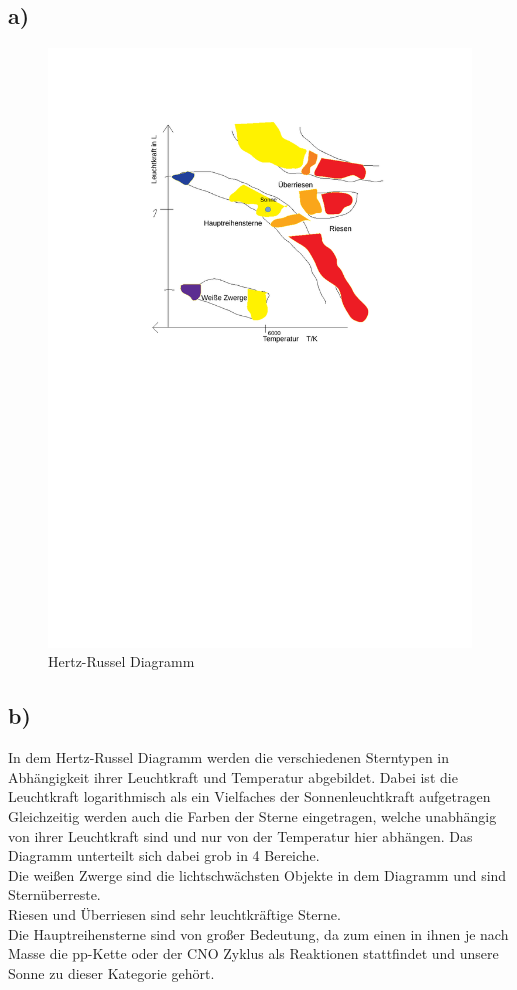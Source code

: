 \subsection{a)}
\begin{figure}[H]
    \centering
    \caption{Hertz-Russel Diagramm}
    \includegraphics[width=\linewidth]{images/hertz_russel.pdf}
\end{figure}

\subsection{b)}
In dem Hertz-Russel Diagramm werden die verschiedenen Sterntypen
in Abhängigkeit ihrer Leuchtkraft und Temperatur abgebildet.
Dabei ist die Leuchtkraft logarithmisch als ein Vielfaches der
Sonnenleuchtkraft aufgetragen
Gleichzeitig werden auch die Farben der Sterne eingetragen, welche unabhängig
von ihrer Leuchtkraft sind und nur von der Temperatur hier abhängen.
Das Diagramm unterteilt sich dabei grob in 4 Bereiche.\\
Die weißen Zwerge sind die lichtschwächsten Objekte in dem Diagramm und sind Sternüberreste.\\
Riesen und Überriesen sind sehr leuchtkräftige Sterne.\\
Die Hauptreihensterne sind von großer Bedeutung, da zum einen in ihnen je nach Masse 
die pp-Kette oder der CNO Zyklus als Reaktionen stattfindet und unsere Sonne zu dieser Kategorie gehört.


